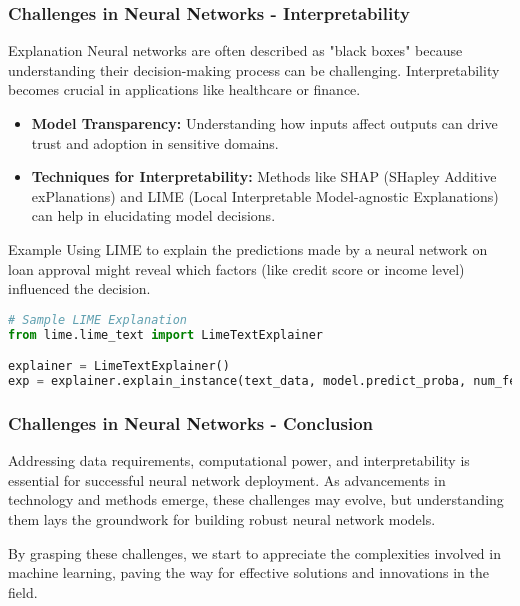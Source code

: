 \documentclass[aspectratio=169]{beamer}
\begin{document}
\begin{frame}[fragile]
    \frametitle{Challenges in Neural Networks - Interpretability}
    \begin{block}{Explanation}
        Neural networks are often described as "black boxes" because understanding their decision-making process can be challenging. Interpretability becomes crucial in applications like healthcare or finance.
    \end{block}

    \begin{itemize}
        \item \textbf{Model Transparency:} Understanding how inputs affect outputs can drive trust and adoption in sensitive domains.
        \item \textbf{Techniques for Interpretability:} Methods like SHAP (SHapley Additive exPlanations) and LIME (Local Interpretable Model-agnostic Explanations) can help in elucidating model decisions.
    \end{itemize}
    
    \begin{block}{Example}
        Using LIME to explain the predictions made by a neural network on loan approval might reveal which factors (like credit score or income level) influenced the decision.
    \end{block}
    
    \begin{lstlisting}[language=Python]
# Sample LIME Explanation
from lime.lime_text import LimeTextExplainer

explainer = LimeTextExplainer()
exp = explainer.explain_instance(text_data, model.predict_proba, num_features=10)
    \end{lstlisting}
\end{frame}

\begin{frame}[fragile]
    \frametitle{Challenges in Neural Networks - Conclusion}
    Addressing data requirements, computational power, and interpretability is essential for successful neural network deployment. As advancements in technology and methods emerge, these challenges may evolve, but understanding them lays the groundwork for building robust neural network models.

    By grasping these challenges, we start to appreciate the complexities involved in machine learning, paving the way for effective solutions and innovations in the field.
\end{frame}
\end{document}
